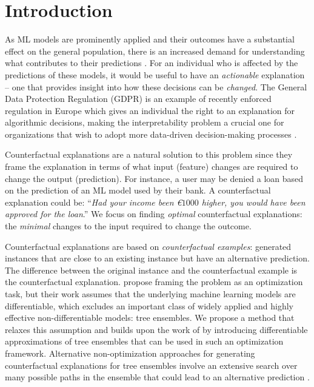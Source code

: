 
\section{Introduction}
\label{section:focus-intro}
As ML models are prominently applied and their outcomes have a substantial effect on the general population, there is an increased demand for understanding what contributes to their predictions \citep{doshi-2017-towards}. 
For an individual who is affected by the predictions of these models, it would be useful to have an \emph{actionable} explanation -- one that provides insight into how these decisions can be \emph{changed}. 
The General Data Protection Regulation (GDPR) is an example of recently enforced regulation in Europe which gives an individual the right to an explanation for algorithmic decisions, making the interpretability problem a crucial one for organizations that wish to adopt more data-driven decision-making processes \citep{gdpr}. 

Counterfactual explanations are a natural solution to this problem since they frame the explanation in terms of what input (feature) changes are required to change the output (prediction). 
For instance, a user may be denied a loan based on the prediction of an ML model used by their bank. 
A counterfactual explanation could be: ``\textit{Had your income been \euro  $1000$ higher, you would have been approved for the loan}.''
We focus on finding \emph{optimal} counterfactual explanations: the \emph{minimal} changes to the input required to change the outcome. 

Counterfactual explanations are based on \emph{counterfactual examples}: generated instances that are close to an existing instance but have an alternative prediction. 
The difference between the original instance and the counterfactual example is the counterfactual explanation. 
\citet{wachter_counterfactual_2017} propose framing the problem as an optimization task, but their work assumes that the underlying machine learning models are differentiable, which excludes an important class of widely applied and highly effective non-differentiable models: tree ensembles. 
We propose a method that relaxes this assumption and builds upon the work of \citeauthor{wachter_counterfactual_2017} by introducing differentiable approximations of tree ensembles that can be used in such an optimization framework. 
Alternative non-optimization approaches for generating counterfactual explanations for tree ensembles involve an extensive search over many possible paths in the ensemble that could lead to an alternative prediction \citep{tolomei_interpretable_2017}. 

